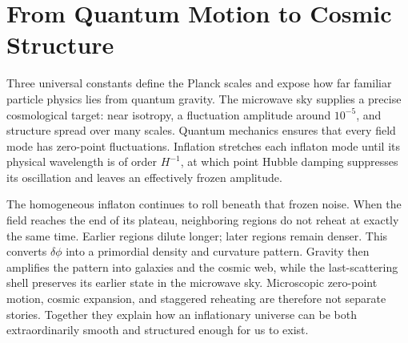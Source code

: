 \begin{classroomqa}
\end{classroomqa}

\section{From Quantum Motion to Cosmic Structure}

Three universal constants define the Planck scales and expose how far familiar particle physics lies from quantum gravity. The microwave sky supplies a precise cosmological target: near isotropy, a fluctuation amplitude around \(10^{-5}\), and structure spread over many scales. Quantum mechanics ensures that every field mode has zero-point fluctuations. Inflation stretches each inflaton mode until its physical wavelength is of order \(H^{-1}\), at which point Hubble damping suppresses its oscillation and leaves an effectively frozen amplitude.

The homogeneous inflaton continues to roll beneath that frozen noise. When the field reaches the end of its plateau, neighboring regions do not reheat at exactly the same time. Earlier regions dilute longer; later regions remain denser. This converts \(\delta\phi\) into a primordial density and curvature pattern. Gravity then amplifies the pattern into galaxies and the cosmic web, while the last-scattering shell preserves its earlier state in the microwave sky. Microscopic zero-point motion, cosmic expansion, and staggered reheating are therefore not separate stories. Together they explain how an inflationary universe can be both extraordinarily smooth and structured enough for us to exist.
